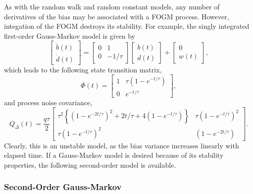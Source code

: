 As with the random walk and random constant models, any number of derivatives of the bias may be associated with a FOGM process.  However, integation of the FOGM destroys its stability.  For example, the singly integrated first-order Gauss-Markov model is given by
\begin{equation}
	\left[\begin{array}{c}
		\dot{b}(t) \\
		\dot{d}(t)
	\end{array}\right] =
	\left[\begin{array}{cc}
		0 & 1 \\
		0 & -1/\tau
	\end{array}\right]
	\left[\begin{array}{c}
		b(t) \\
		d(t)
	\end{array}\right]
	+ \left[\begin{array}{c}
		0 \\
		w(t)
	\end{array}\right],
\end{equation}
which leads to the following state transition matrix,
\begin{equation}
	\Phi(t) = \left[\begin{array}{cc}
		1 & \tau \left( 1-e^{-t/\tau} \right) \\
		0 & e^{-t/\tau}
	\end{array}\right],
\end{equation}
and process noise covariance,
\begin{equation}
	Q_\Delta(t) = \frac{q\tau}{2} \left[\begin{array}{cc}
		\tau^2 \left\{ \left( 1-e^{-2t/\tau} \right)^2  +2t/\tau
		+ 4 \left( 1-e^{-t/\tau} \right) \right\}
		& \tau \left( 1-e^{-t/\tau} \right)^2 \\
		\tau \left( 1-e^{-t/\tau} \right)^2 & \left( 1-e^{-2t/\tau} \right)
	\end{array}\right].
\end{equation}
Clearly, this is an unstable model, as the bias variance increases linearly with elapsed time.  If a Gauss-Markov model is desired because of its stability properties, the following second-order model is available.

\subsubsection{Second-Order Gauss-Markov}

